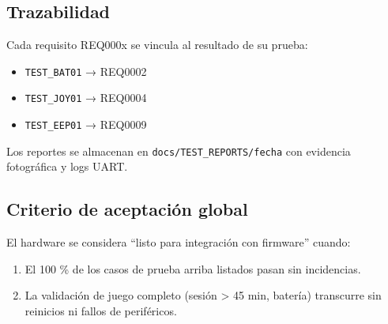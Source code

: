\documentclass[11pt,a4paper]{article}
\begin{document}
\subsection{Trazabilidad}
Cada requisito REQ000x se vincula al resultado de su prueba:
\begin{itemize}
  \item \texttt{TEST\_BAT01} → REQ0002  
  \item \texttt{TEST\_JOY01} → REQ0004  
  \item \texttt{TEST\_EEP01} → REQ0009  
\end{itemize}
Los reportes se almacenan en
\texttt{docs/TEST\_REPORTS/\<fecha\>} con evidencia fotográfica y
logs UART.

\subsection{Criterio de aceptación global}
El hardware se considera “listo para integración con firmware” cuando:
\begin{enumerate}
  \item El 100 \% de los casos de prueba arriba listados pasan sin
        incidencias.
  \item La validación de juego completo (sesión > 45 min, batería)
        transcurre sin reinicios ni fallos de periféricos.
\end{enumerate}

\end{document}

